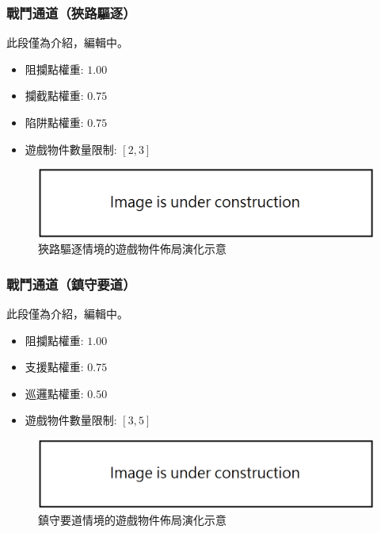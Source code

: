 \subsubsection{戰鬥通道（狹路驅逐）}
\label{sssec:method-segments-appliedonvolumes-battlepath-narrow}

此段僅為介紹，編輯中。

\begin{itemize}
  \setlength\itemsep{-0.5em}
  \item 阻攔點權重: $1.00$
  \item 攔截點權重: $0.75$
  \item 陷阱點權重: $0.75$
  \item 遊戲物件數量限制: $[2, 3]$
\end{itemize}

\begin{figure}[!htb]
  \begin{center}
    \includegraphics[width=1.0\textwidth]{figures/under_construction.png}
    \caption{狹路驅逐情境的遊戲物件佈局演化示意} 
    \label{fig:applied-ga-on-volume-battlepath-narrow}
  \end{center}
\end{figure}

\subsubsection{戰鬥通道（鎮守要道）}
\label{sssec:method-segments-appliedonvolumes-battlepath-trunk}

此段僅為介紹，編輯中。

\begin{itemize}
  \setlength\itemsep{-0.5em}
  \item 阻攔點權重: $1.00$
  \item 支援點權重: $0.75$
  \item 巡邏點權重: $0.50$
  \item 遊戲物件數量限制: $[3, 5]$
\end{itemize}

\begin{figure}[!htb]
  \begin{center}
    \includegraphics[width=1.0\textwidth]{figures/under_construction.png}
    \caption{鎮守要道情境的遊戲物件佈局演化示意} 
    \label{fig:applied-ga-on-volume-battlepath-trunk}
  \end{center}
\end{figure}

